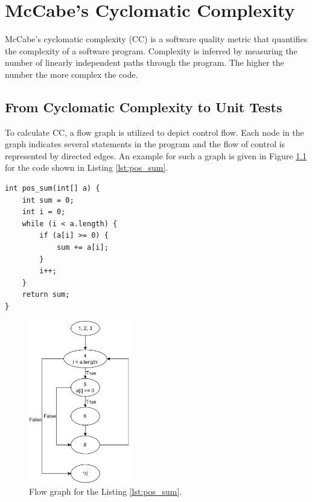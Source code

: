 \chapter{McCabe's Cyclomatic Complexity}
McCabe's cyclomatic complexity (CC) is a software quality metric that quantifies the complexity of a software program. Complexity is inferred by measuring the number of linearly independent paths through the program. The higher the number the more complex the code.

\section{From Cyclomatic Complexity to Unit Tests}
To calculate CC, a flow graph is utilized to depict control flow. Each node in the graph indicates several statements in the program and the flow of control is represented by directed edges. An example for such a graph is given in Figure \ref{fig:flow-graph-eg} for the code shown in Listing \ref{lst:pos_sum}.

\begin{lstlisting}[caption={pos\_sum finds the sum of all positive numbers stored in an integer array a. Input parameter is a, an array of integers. The output of the function is sum, the sum of integers inside the array a.},label=lst:pos_sum]
int pos_sum(int[] a) {
    int sum = 0;
    int i = 0;
    while (i < a.length) {
        if (a[i] >= 0) {
            sum += a[i];
        }
        i++;
    }
    return sum;
}
\end{lstlisting}

\begin{figure}[H]
    \centering
    \includegraphics[width=0.4\textwidth]{images/flow-graph-eg.png}
    \caption{Flow graph for the Listing \ref{lst:pos_sum}.}
    \label{fig:flow-graph-eg}
\end{figure}

